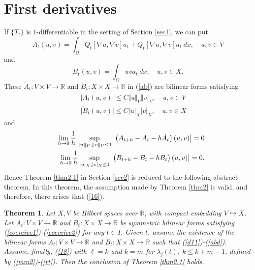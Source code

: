 \documentclass[final,a4paper]{jmsj}
\newcommand{\R}{\mathbb R}
\theoremstyle{thmstyleone}%
\newtheorem{theorem}{Theorem}
\theoremstyle{thmstyletwo}%
\theoremstyle{thmstylethree}%
\begin{document}
\section{First derivatives}\label{sec5}

If $\{ T_t\}$ is $1$-differentiable in the setting of Section \ref{sec1}, we can put   
\[ \dot A_t(u,v)=\int_\Omega \dot Q_t[\nabla u, \nabla v]a_t+Q_t[\nabla u, \nabla v]\dot a_t \ dx, \quad u, v\in V \] 
and 
\[ \dot B_t(u,v)=\int_\Omega uv \dot a_t \ dx, \quad u, v\in X. \] 
These $\dot A_t:V\times V\rightarrow \R$ and $\dot B_t:X\times X\rightarrow \R$ in (\ref{ab}) are bilinear forms  
satisfying 
\begin{eqnarray} 
& & \vert \dot A_t(u,v)\vert \leq C\Vert u\Vert_V\Vert v\Vert_V, \quad u,v\in V \nonumber\\ 
& & \vert \dot B_t(u,v)\vert \leq C\vert u\vert_X\vert v\vert_X, \quad u, v\in X 
 \label{d11}  
\end{eqnarray} 
and   
\begin{eqnarray} 
& & {\color {black} \lim_{h\rightarrow 0}\frac{1}{h}\sup_{\Vert u\Vert_V, \Vert v\Vert_V\leq 1}
\left\vert \left(A_{t+h}-A_t-h\dot A_t\right)(u,v)\right\vert =0} \nonumber\\ 
& & {\color {black} \lim_{h\rightarrow 0}\frac{1}{h}\sup_{\vert u\vert_X, \vert v\vert_X\leq 1}
\left\vert \left(B_{t+h}-B_t-h\dot B_t\right)(u,v)\right\vert =0.} 
 \label{abd}
\end{eqnarray} 
Hence Theorem \ref{thm2.1} in Section \ref{sec2} is reduced to the following abstract theorem. 
In this theorem, the assumption made by Theorem \ref{thm2} is valid, and therefore, there arises that (\ref{16}). 

\begin{theorem}\label{thm2.1abst} 
Let $X, V$ be Hilbert spaces over $\mathbb{R}$, with compact embedding $V\hookrightarrow X$. Let  $A_t:V\times V\rightarrow \mathbb{R}$ and $B_t:X\times X\rightarrow \mathbb{R}$ be symmetric bilinear forms satisfying (\ref{coercive1})-(\ref{coercive2}) for any $t\in I$. Given $t$, assume the existence of the bilinear forms $\dot A_t:V\times V\rightarrow \mathbb{R}$ and $\dot B_t:X\times X\rightarrow \mathbb{R}$ such that (\ref{d11})-(\ref{abd}). Assume, finally, (\ref{18}) with $\ell=k$ and $k=m$ for $\lambda_j(t)$, $k\leq k+m-1$, defined by (\ref{mm2})-(\ref{rt}). Then the conclusion of Theorem \ref{thm2.1} holds.  
\end{theorem} 
\end{document}
